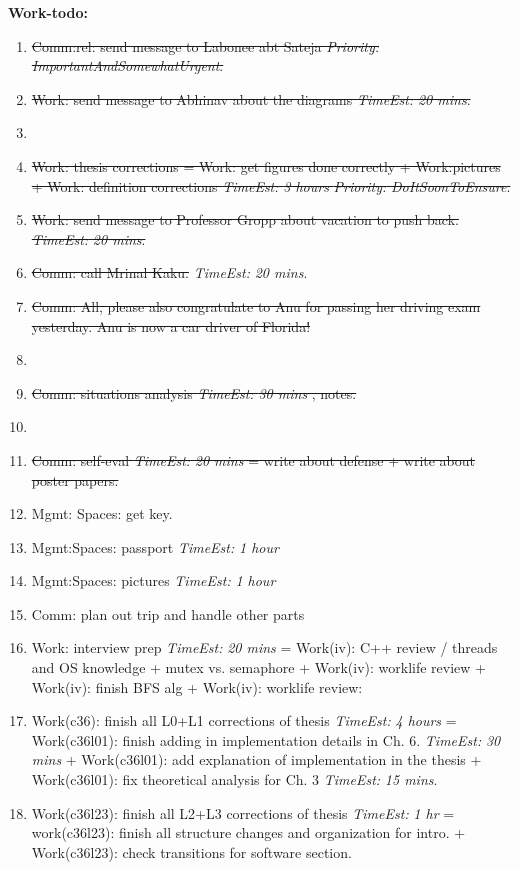 \documentclass[11pt]{article}
\newcommand{\doneTask}[1]{\item \sout{\small #1}}
\newcommand{\te}[1]{\textit{TimeEst:} \textit{#1}}
\newcommand{\priority}[1]{\textit{Priority:} \textit{#1}}
\newcommand{\prio}[1]{\textit{Priority:} \textit{#1}}
\begin{document}
\textbf{Work-todo:}\\ 
\begin{enumerate} 

\doneTask{ Comm:rel: send message to Labonee abt Sateja
  \priority{ImportantAndSomewhatUrgent}.} 



\doneTask{ Work: send message to Abhinav about the diagrams \te{20
    mins}. } 

\item \doneTask{Work: thesis corrections = Work: get figures done correctly +
  Work:pictures + Work: definition corrections \te{3 hours}
  \prio{DoItSoonToEnsure}. } 

\doneTask{ Work: send message to Professor Gropp about vacation to push
  back. \te{20 mins}. } 
\doneTask{ Comm: call Mrinal Kaku.} \te{20 mins}.

\doneTask{ Comm:   All, please also congratulate to Anu for passing her
  driving exam yesterday. Anu is now a car driver of Florida!} 
\item \doneTask{Comm: situations analysis \te{ 30 mins }, notes. }
\item \doneTask{Comm: self-eval \te{20 mins} = write about defense  + write
  about poster papers. }


\item Mgmt: Spaces: get key.  


\item Mgmt:Spaces: passport \te{1 hour} 
\item Mgmt:Spaces: pictures \te {1 hour} 

\item Comm: plan out trip and handle other parts

\item Work: interview prep \te{20 mins}  = 
Work(iv): C++ review / threads and OS  knowledge + mutex vs. semaphore 
 + Work(iv): worklife review +  Work(iv): finish BFS alg + Work(iv):
 worklife review: 

\item Work(c36): finish all L0+L1 corrections of thesis \te{4 hours} =
  Work(c36l01): finish adding in implementation details in Ch. 6.  \te{30
    mins} + Work(c36l01): add explanation of implementation in the thesis
  + Work(c36l01): fix theoretical analysis for Ch. 3 \te{15 mins}. 

\item Work(c36l23): finish all L2+L3 corrections of thesis \te{1 hr}  =
  work(c36l23): finish all structure changes and organization for 
  intro. + Work(c36l23): check transitions for software section. 


\end{enumerate}
\end{document}
